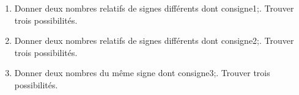 \documentclass[exercice]{thedocument}%
\begin{document}
%
\begin{enumerate}
    \item Donner deux nombres relatifs de signes différents dont \<consigne1;. Trouver trois possibilités.
    \item Donner deux nombres relatifs de signes différents dont \<consigne2;. Trouver trois possibilités.
    \item Donner deux nombres du même signe dont \<consigne3;. Trouver trois possibilités.
\end{enumerate}
\end{document}
